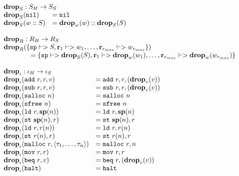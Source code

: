 {\[\begin{array}{l}
\begin{array}{ll}
\rlap{$\drop{S} : \high S -> \simple{S}$} \\
\drop{S}(\mathtt{nil}) &= \mathtt{nil} \\
\drop{S}(w :: S) &= \drop{w}(w) :: \drop{S}(S) \\
\end{array} \\\\

\begin{array}{l}
\drop{R} : \high R -> \simple{R} \\
\drop{R}(\{\mathtt{sp} |-> S, \mathbf{r}_1 |-> w_1, \dots, \mathbf{r}_{r_{max}} |-> w_{r_{max}}\})\\
\quad\quad\quad\quad = \{\mathtt{sp} |-> \drop{S}(S), \mathbf{r}_1 |-> \drop{w}(w_1), \dots, \mathbf{r}_{r_{max}} |-> \drop{w}(w_{r_{max}})\}
\end{array} \\\\

\begin{array}{ll}
\rlap{$\drop{\iota} : \high\iota -> \simple\iota$} \\
\drop{\iota}(\mathtt{add}\ r, r, v) &= \mathtt{add}\ r, r, (\drop{v}(v)) \\
\drop{\iota}(\mathtt{sub}\ r, r, v) &= \mathtt{sub}\ r, r, (\drop{v}(v)) \\
\drop{\iota}(\mathtt{salloc}\ n) &= \mathtt{salloc}\ n \\
\drop{\iota}(\mathtt{sfree}\ n) &= \mathtt{sfree}\ n \\
\drop{\iota}(\mathtt{ld}\ r, \mathbf{sp}(n)) &= \mathtt{ld}\ r, \mathbf{sp}(n) \\
\drop{\iota}(\mathtt{st}\ \mathbf{sp}(n), r) &= \mathtt{st}\ \mathbf{sp}(n), r \\
\drop{\iota}(\mathtt{ld}\ r, r(n)) &= \mathtt{ld}\ r, r(n) \\
\drop{\iota}(\mathtt{st}\ r(n), r) &= \mathtt{st}\ r(n), r \\
\drop{\iota}(\mathtt{malloc}\ r, \langle \tau_1, \dots, \tau_n \rangle) &= \mathtt{malloc}\ r, n \\
\drop{\iota}(\mathtt{mov}\ r, r) &= \mathtt{mov}\ r, r \\
\drop{\iota}(\mathtt{beq}\ r, v) &= \mathtt{beq}\ r, (\drop{v}(v)) \\
\drop{\iota}(\mathtt{halt}) &= \mathtt{halt} \\
\end{array} \\\\


\end{array}\]}
